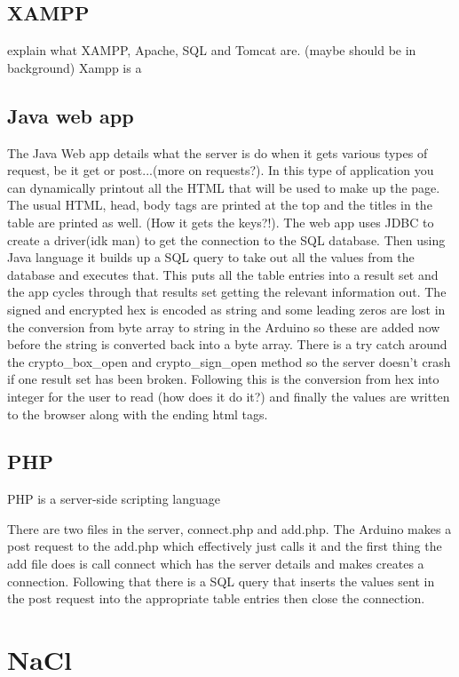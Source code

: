 \subsection{XAMPP}

explain what XAMPP, Apache, SQL and Tomcat are. (maybe should be in background)
Xampp is a 

\subsection{Java web app}

The Java Web app details what the server is do when it gets various types of request, be it get or post...(more on requests?). In this type of application you can dynamically printout all the HTML that will be used to make up the page. The usual  HTML, head, body tags are printed at the top and the titles in the table are printed as well. (How it gets the keys?!). The web app uses JDBC to create a driver(idk man) to get the connection to the SQL database. Then using Java language it builds up a SQL query to take out all the values from the database and executes that. This puts all the table entries into a result set and the app cycles through that results set getting the relevant information out. The signed and encrypted hex is encoded as string and some leading zeros are lost in the conversion from byte array to string in the Arduino so these are added now before the string is converted back into a byte array. There is a try catch around the crypto\_box\_open and crypto\_sign\_open method so the server doesn't crash if one result set has been broken. Following this is the conversion from hex into integer for the user to read (how does it do it?) and finally the values are written to the browser along with the ending html tags.

\subsection{PHP}
PHP is a server-side scripting language 

There are two files in the server, connect.php and add.php. The Arduino makes a post request to the add.php which effectively just calls it and the first thing the add file does is call connect which has the server details and makes creates a connection. Following that there is a SQL query that inserts the values sent in the post request into the appropriate table entries then close the connection. 

\section{NaCl}


